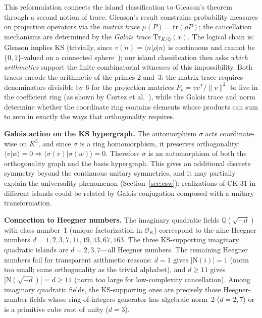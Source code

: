 \documentclass[12pt,a4paper]{article}
\newcommand{\Q}{\mathbb{Q}}
\begin{document}
This reformulation connects the island classification to Gleason's theorem through a second notion of trace.  Gleason's result constrains probability measures on projection operators via the \emph{matrix trace} $\mu(P) = \mathrm{tr}(\rho P)$; the cancellation mechanisms are determined by the \emph{Galois trace} $\mathrm{Tr}_{K/\Q}(x)$.  The logical chain is: Gleason implies KS (trivially, since $v(n) = \langle n | \rho | n \rangle$ is continuous and cannot be $\{0,1\}$-valued on a connected sphere~\cite{RajanVisser2019}); our island classification then asks \emph{which arithmetics} support the finite combinatorial witnesses of this impossibility.  Both traces encode the arithmetic of the primes 2 and~3: the matrix trace requires denominators divisible by 6 for the projection matrices $P_v = vv^T/\|v\|^2$ to live in the coefficient ring (as shown by Cortez et al.~\cite{CortezMoralesReyes2022}), while the Galois trace and norm determine whether the coordinate ring contains elements whose products can sum to zero in exactly the ways that orthogonality requires.

\smallskip\noindent\textbf{Galois action on the KS hypergraph.}  The automorphism $\sigma$ acts coordinate-wise on $K^3$, and since $\sigma$ is a ring homomorphism, it preserves orthogonality: $\langle v | w \rangle = 0 \Rightarrow \langle \sigma(v) | \sigma(w) \rangle = 0$.  Therefore $\sigma$ is an automorphism of both the orthogonality graph and the basis hypergraph.  This gives an additional discrete symmetry beyond the continuous unitary symmetries, and it may partially explain the universality phenomenon (Section~\ref{sec:csw}): realizations of CK-31 in different islands could be related by Galois conjugation composed with a unitary transformation.

\smallskip\noindent\textbf{Connection to Heegner numbers.}  The imaginary quadratic fields $\Q(\sqrt{-d})$ with class number~1 (unique factorization in $\mathcal{O}_K$) correspond to the nine Heegner numbers $d = 1, 2, 3, 7, 11, 19, 43, 67, 163$.  The three KS-supporting imaginary quadratic islands are $d = 2, 3, 7$---all Heegner numbers.  The remaining Heegner numbers fail for transparent arithmetic reasons: $d = 1$ gives $|\mathrm{N}(i)| = 1$ (norm too small; same orthogonality as the trivial alphabet), and $d \geq 11$ gives $|\mathrm{N}(\sqrt{-d})| = d \geq 11$ (norm too large for low-complexity cancellation).  Among imaginary quadratic fields, the KS-supporting ones are precisely those Heegner-number fields whose ring-of-integers generator has algebraic norm~2 ($d = 2, 7$) or is a primitive cube root of unity ($d = 3$).
\end{document}
